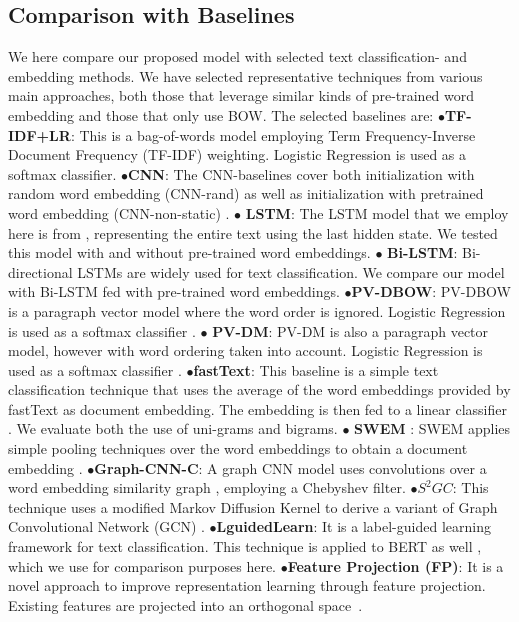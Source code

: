 \documentclass[11pt]{article}
\begin{document}
\subsection{Comparison with Baselines}
We here compare our proposed model with selected text classification- and embedding methods. We have selected representative techniques from various main approaches, both those that leverage similar kinds of pre-trained word embedding and those that only use BOW. The selected baselines are:
$\bullet$\textbf{TF-IDF+LR}: This is a bag-of-words model employing Term Frequency-Inverse Document Frequency (TF-IDF) weighting. Logistic Regression is used as a softmax classifier.
    $\bullet$\textbf{CNN}: The CNN-baselines cover both  initialization with random word embedding (CNN-rand) as well as initialization with pretrained word embedding (CNN-non-static) \cite{kim2014}.
    $\bullet$ \textbf{LSTM}: The LSTM model that we employ here is from \cite{Liu2016}, representing the entire text using the last hidden state. We tested this model with and without pre-trained word embeddings.
    $\bullet$ \textbf{Bi-LSTM}: Bi-directional LSTMs are widely used for text classification. We compare our model with Bi-LSTM fed with pre-trained word embeddings.
    $\bullet$\textbf{PV-DBOW}: PV-DBOW is a paragraph vector model where the word order is ignored. Logistic Regression is used as a softmax classifier \cite{pmlrle14}.
    $\bullet$ \textbf{PV-DM}: PV-DM is also a paragraph vector model, however with word ordering taken into account. Logistic Regression is used as a softmax classifier \cite{pmlrle14}.
     $\bullet$\textbf{fastText}: This baseline is a simple text classification technique that uses the average of the word embeddings provided by fastText as document embedding. The embedding is then fed to a linear classifier \cite{joulin2017bag}. We evaluate both the use of uni-grams and bigrams.
    $\bullet$ \textbf{SWEM} : SWEM applies simple pooling techniques over the word embeddings to obtain a document embedding \cite{shen2018baseline}.
     $\bullet$\textbf{Graph-CNN-C}: A graph CNN model uses convolutions over a word embedding similarity graph \cite{NIPS2016_04df4d43}, employing a Chebyshev filter.
    $\bullet$\textbf{\(S^2GC\)}: This technique uses a modified Markov Diffusion Kernel to derive a variant of Graph Convolutional Network (GCN) \cite{zhu2021simple}.
     $\bullet$\textbf{LguidedLearn}: It is a label-guided learning framework for text classification. This technique is applied to BERT as well \cite{Liu2020LabelguidedLF}, which we use for comparison purposes here.
    $\bullet$\textbf{Feature Projection (FP)}: It is a novel approach to improve representation learning through feature projection. Existing features are projected into an orthogonal space~\cite{qin-etal-2020-feature}.
\end{document}
